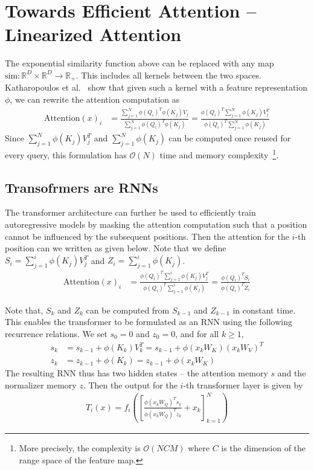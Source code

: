 \documentclass{article}
\newcommand{\R}{\mathbb{R}}
\begin{document}
    \section{Towards Efficient Attention -- Linearized Attention}
    The exponential similarity function above can be replaced with any map $\text{sim}: \R^D \times \R^D \to \R_+$. This includes all kernels between the two spaces. Katharopoulos et al.~\cite{transformersRNN} show that given such a kernel with a feature representation $\phi$, we can rewrite the attention computation as
    \begin{align*}
        \text{Attention}(x)_i &= \frac{\sum_{j=1}^N \phi(Q_i)^T\phi(K_j)V_j}{\sum_{j=1}^N \phi(Q_i)^T\phi(K_j)} = \frac{\phi(Q_i)^T\sum_{j=1}^N \phi(K_j)V_j^T}{ \phi(Q_i)^T \sum_{j=1}^N \phi(K_j)}
    \end{align*}
    Since $\sum_{j=1}^N \phi(K_j)V_j^T$ and $\sum_{j=1}^N \phi(K_j)$ can be computed once reused for every query, this formulation has $\mathcal{O}(N)$ time and memory complexity~\footnote{More precisely, the complexity is $\mathcal{O}(NCM)$ where $C$ is the dimension of the range space of the feature map.}. 

\subsection{Transofrmers are RNNs}
The transformer architecture can further be used to efficiently train autoregressive models by masking the attention computation such that a position cannot be influenced by the subsequent positions. Then the attention for the $i$-th position can we written as given below. Note that we define $S_i = \sum_{j=1}^i \phi(K_j)V_j^T$ and $Z_i = \sum_{j=1}^i \phi(K_j)$. 
\begin{align*}
    \text{Attention}(x)_i &= \frac{\phi(Q_i)^T\sum_{j=1}^i \phi(K_j)V_j^T}{ \phi(Q_i)^T \sum_{j=1}^i \phi(K_j)} = \frac{\phi(Q_i)^TS_i}{\phi(Q_i)^TZ_i}
\end{align*}

Note that, $S_k$ and $Z_k$ can be computed from $S_{k-1}$ and $Z_{k-1}$ in constant time. This enables the transformer to be formulated as an RNN using the following recurrence relations. We set $s_0 = 0$ and $z_0 = 0$, and for all $k \ge 1$,
\begin{align*}
    s_k &= s_{k-1} + \phi(K_k)V_k^T = s_{k-1} + \phi(x_kW_K)(x_kW_V)^T \\
    z_k &= z_{k-1} + \phi(K_k) = z_{k-1} + \phi(x_kW_K)
\end{align*}
The resulting RNN thus has two hidden states -- the attention memory $s$ and the normalizer memory $z$. Then the output for the $i$-th transformer layer is given by
\begin{align*}
    T_i(x)=f_i \left( \left[ \frac{\phi(x_kW_Q)^Ts_k}{\phi(x_kW_Q)^Tz_k} + x_k \right]_{k=1}^N \right)
\end{align*}
\end{document}
